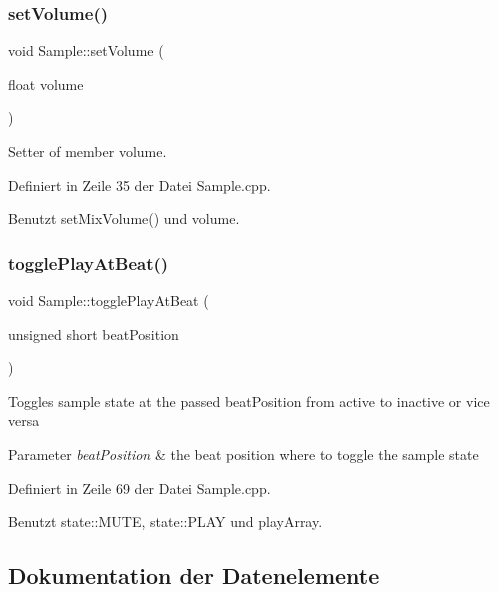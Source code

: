 \mbox{\label{class_sample_ae298bfb5c8c1c3c867fa962e799a2fa5}} 
\subsubsection{\texorpdfstring{set\+Volume()}{setVolume()}}
{\footnotesize\ttfamily void Sample\+::set\+Volume (\begin{DoxyParamCaption}\item[{float}]{volume }\end{DoxyParamCaption})}



Setter of member volume. 



Definiert in Zeile 35 der Datei Sample.\+cpp.



Benutzt set\+Mix\+Volume() und volume.

\mbox{\label{class_sample_a4bf009853c35f7a29955fa2554d8e799}} 
\subsubsection{\texorpdfstring{toggle\+Play\+At\+Beat()}{togglePlayAtBeat()}}
{\footnotesize\ttfamily void Sample\+::toggle\+Play\+At\+Beat (\begin{DoxyParamCaption}\item[{unsigned short}]{beat\+Position }\end{DoxyParamCaption})}

Toggles sample state at the passed beat\+Position from active to inactive or vice versa 
\begin{DoxyParams}{Parameter}
{\em beat\+Position} & the beat position where to toggle the sample state \\
\hline
\end{DoxyParams}


Definiert in Zeile 69 der Datei Sample.\+cpp.



Benutzt state\+::\+M\+U\+TE, state\+::\+P\+L\+AY und play\+Array.



\subsection{Dokumentation der Datenelemente}
\mbox{\label{class_sample_a2d48ff8caf8425c37cf74130afb0c87a}} 
